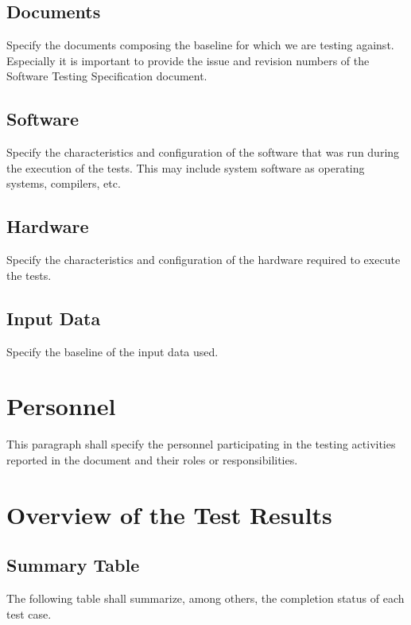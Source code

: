 \documentclass[DM,lsstdraft,STR,toc]{lsstdoc}
\begin{document}
\subsection{Documents \label{sect:docsconf}}
Specify the documents composing the baseline for which we are testing against. Especially it is important to provide the  issue
and revision numbers of the Software Testing Specification document.
\subsection{Software \label{sect:swconf}}
Specify the characteristics and configuration of the software that was run during the execution of the tests. This may include
system software as operating systems, compilers, etc.
\subsection{Hardware \label{sect:hwconf}}
Specify the characteristics and configuration of the hardware required to execute the tests.
\subsection{Input Data \label{sect:inputdata}}
Specify the baseline of the input data used.

\section{Personnel \label{sect:personnel}}
This paragraph shall specify the personnel participating in the testing activities reported in the document and their
roles or responsibilities.

\newpage

\section{Overview of the Test Results \label{sect:overview}}
\subsection{Summary Table \label{sect:summarytable}}
The following table shall summarize, among others, the completion status of each test case.\\
\end{document}

